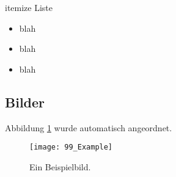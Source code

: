 itemize Liste
\begin{itemize}[] %
\item[AF1] blah
\item[AF1.1] blah
\item[AF2] blah
\end{itemize}

\subsection{Bilder}
%
%

Abbildung \ref{fig_Beispiel} wurde automatisch angeordnet.
\begin{figure}[!ht]
\centering
\texttt{[image: 99\_Example]}
\caption{Ein Beispielbild.}
\label{fig_Beispiel}
\end{figure}



%
%

